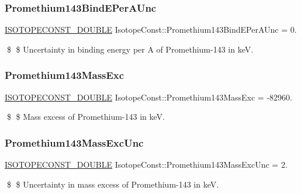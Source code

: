 \subsubsection{\texorpdfstring{Promethium143\+Bind\+E\+Per\+A\+Unc}{Promethium143BindEPerAUnc}}
{\footnotesize\ttfamily \mbox{\hyperlink{group___isotope_const-_macros_ga8f45a7272ce02c0b4c65c44636ed719a}{I\+S\+O\+T\+O\+P\+E\+C\+O\+N\+S\+T\+\_\+\+D\+O\+U\+B\+LE}} Isotope\+Const\+::\+Promethium143\+Bind\+E\+Per\+A\+Unc = 0.}

\$ \$ Uncertainty in binding energy per A of Promethium-\/143 in keV. \mbox{\label{group___isotope_const-_promethium-_pm143_ga00f3a88844f4f21c891968dc8cf4ecb2}} 
\subsubsection{\texorpdfstring{Promethium143\+Mass\+Exc}{Promethium143MassExc}}
{\footnotesize\ttfamily \mbox{\hyperlink{group___isotope_const-_macros_ga8f45a7272ce02c0b4c65c44636ed719a}{I\+S\+O\+T\+O\+P\+E\+C\+O\+N\+S\+T\+\_\+\+D\+O\+U\+B\+LE}} Isotope\+Const\+::\+Promethium143\+Mass\+Exc = -\/82960.}

\$ \$ Mass excess of Promethium-\/143 in keV. \mbox{\label{group___isotope_const-_promethium-_pm143_gafa32cee9524d3525f0ec45e425a4398c}} 
\subsubsection{\texorpdfstring{Promethium143\+Mass\+Exc\+Unc}{Promethium143MassExcUnc}}
{\footnotesize\ttfamily \mbox{\hyperlink{group___isotope_const-_macros_ga8f45a7272ce02c0b4c65c44636ed719a}{I\+S\+O\+T\+O\+P\+E\+C\+O\+N\+S\+T\+\_\+\+D\+O\+U\+B\+LE}} Isotope\+Const\+::\+Promethium143\+Mass\+Exc\+Unc = 2.}

\$ \$ Uncertainty in mass excess of Promethium-\/143 in keV. \mbox{\label{group___isotope_const-_promethium-_pm143_ga95c44e6529e52cbad17c35234598233a}} 
